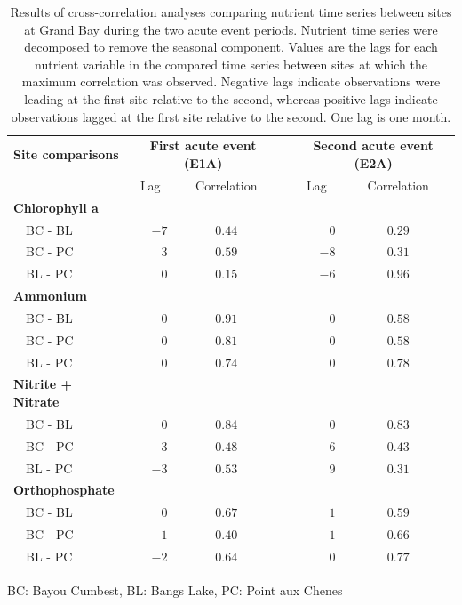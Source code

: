 \documentclass[letterpaper,12pt]{article}\usepackage[]{graphicx}\usepackage[]{color}
\begin{document}
\begin{table}[!tbp]
\caption{Results of cross-correlation analyses comparing nutrient time series between sites at Grand Bay during the two acute event periods.  Nutrient time series were decomposed to remove the seasonal component.  Values are the lags for each nutrient variable in the compared time series between sites at which the maximum correlation was observed.  Negative lags indicate observations were leading at the first site relative to the second, whereas positive lags indicate observations lagged at the first site relative to the second.  One lag is one month.\label{tab:ccfnut}} 
\begin{center}
\begin{tabular}{lrccrc}
\hline\hline
\multicolumn{1}{l}{\bfseries Site comparisons}&\multicolumn{2}{c}{\bfseries First acute event (E1A)}&\multicolumn{1}{c}{\bfseries }&\multicolumn{2}{c}{\bfseries Second acute event (E2A)}\tabularnewline
\cline{2-3} \cline{5-6}
\multicolumn{1}{l}{}&\multicolumn{1}{c}{Lag}&\multicolumn{1}{c}{Correlation}&\multicolumn{1}{c}{}&\multicolumn{1}{c}{Lag}&\multicolumn{1}{c}{Correlation}\tabularnewline
\hline
{\bfseries Chlorophyll a}&&&&&\tabularnewline
~~BC - BL&$-7$&$0.44$&&$ 0$&$0.29$\tabularnewline
~~BC - PC&$ 3$&$0.59$&&$-8$&$0.31$\tabularnewline
~~BL - PC&$ 0$&$0.15$&&$-6$&$0.96$\tabularnewline
\hline
{\bfseries Ammonium}&&&&&\tabularnewline
~~BC - BL&$ 0$&$0.91$&&$ 0$&$0.58$\tabularnewline
~~BC - PC&$ 0$&$0.81$&&$ 0$&$0.58$\tabularnewline
~~BL - PC&$ 0$&$0.74$&&$ 0$&$0.78$\tabularnewline
\hline
{\bfseries Nitrite + Nitrate}&&&&&\tabularnewline
~~BC - BL&$ 0$&$0.84$&&$ 0$&$0.83$\tabularnewline
~~BC - PC&$-3$&$0.48$&&$ 6$&$0.43$\tabularnewline
~~BL - PC&$-3$&$0.53$&&$ 9$&$0.31$\tabularnewline
\hline
{\bfseries Orthophosphate}&&&&&\tabularnewline
~~BC - BL&$ 0$&$0.67$&&$ 1$&$0.59$\tabularnewline
~~BC - PC&$-1$&$0.40$&&$ 1$&$0.66$\tabularnewline
~~BL - PC&$-2$&$0.64$&&$ 0$&$0.77$\tabularnewline
\hline
\end{tabular}\end{center}

\footnotesize BC: Bayou Cumbest, BL: Bangs Lake, PC: Point aux Chenes\end{table}
\end{document}
